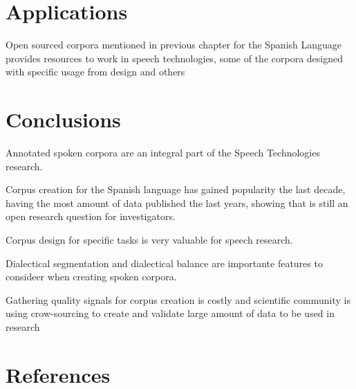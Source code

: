 \documentclass[10pt, a4paper]{article}
\begin{document}
\section{Applications}

Open sourced corpora mentioned in previous chapter for the Spanish Language provides resources to work in speech technologies, some of the corpora designed with specific usage from design and others

\section{Conclusions}

Annotated spoken corpora are an integral part of the Speech Technologies research.

Corpus creation for the Spanish language has gained popularity the last decade, having the most amount of data published the last years, showing that is still an open research question for investigators.

Corpus design for specific tasks is very valuable for speech research.

Dialectical segmentation and dialectical balance are importante features to consideer when creating spoken corpora.

Gathering quality signals for corpus creation is costly and scientific community is using crow-sourcing to create and validate large amount of data to be used in research

\section{References}



\end{document}
